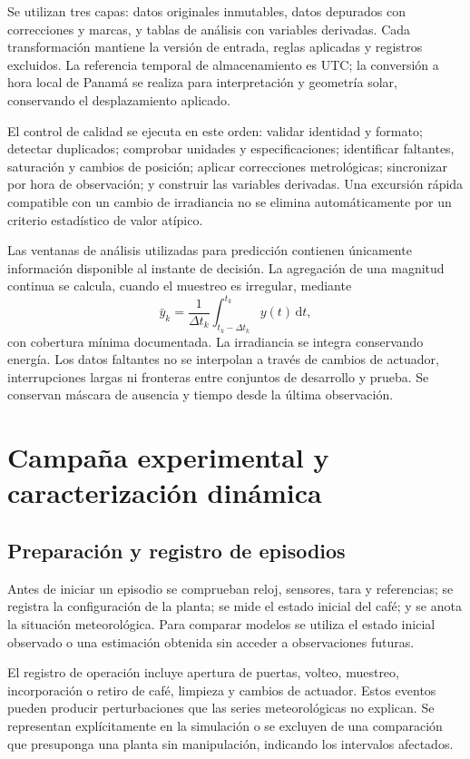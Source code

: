 Se utilizan tres capas: datos originales inmutables, datos depurados con correcciones y marcas, y tablas de análisis con variables derivadas. Cada transformación mantiene la versión de entrada, reglas aplicadas y registros excluidos. La referencia temporal de almacenamiento es UTC; la conversión a hora local de Panamá se realiza para interpretación y geometría solar, conservando el desplazamiento aplicado.

El control de calidad se ejecuta en este orden: validar identidad y formato; detectar duplicados; comprobar unidades y especificaciones; identificar faltantes, saturación y cambios de posición; aplicar correcciones metrológicas; sincronizar por hora de observación; y construir las variables derivadas. Una excursión rápida compatible con un cambio de irradiancia no se elimina automáticamente por un criterio estadístico de valor atípico.

Las ventanas de análisis utilizadas para predicción contienen únicamente información disponible al instante de decisión. La agregación de una magnitud continua se calcula, cuando el muestreo es irregular, mediante
\begin{equation}
\bar y_k=\frac{1}{\Delta t_k}\int_{t_k-\Delta t_k}^{t_k}y(t)\,\mathrm dt,
\label{met:agregacion_causal}
\end{equation}
con cobertura mínima documentada. La irradiancia se integra conservando energía. Los datos faltantes no se interpolan a través de cambios de actuador, interrupciones largas ni fronteras entre conjuntos de desarrollo y prueba. Se conservan máscara de ausencia y tiempo desde la última observación.

\section{Campaña experimental y caracterización dinámica}
\label{met:campana}

\subsection{Preparación y registro de episodios}

Antes de iniciar un episodio se comprueban reloj, sensores, tara y referencias; se registra la configuración de la planta; se mide el estado inicial del café; y se anota la situación meteorológica. Para comparar modelos se utiliza el estado inicial observado o una estimación obtenida sin acceder a observaciones futuras.

El registro de operación incluye apertura de puertas, volteo, muestreo, incorporación o retiro de café, limpieza y cambios de actuador. Estos eventos pueden producir perturbaciones que las series meteorológicas no explican. Se representan explícitamente en la simulación o se excluyen de una comparación que presuponga una planta sin manipulación, indicando los intervalos afectados.

